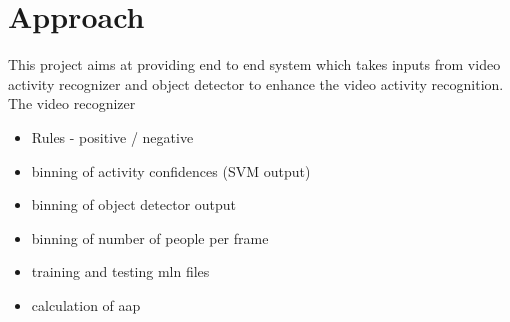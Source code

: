 \chapter{Approach}
\label{ch4_APPROACH}

This project aims at providing end to end system which takes inputs from
video activity recognizer and object detector to enhance the video activity recognition.
The video recognizer

\begin{itemize}
	\item Rules - positive / negative
	\item binning of activity confidences (SVM output)
	\item binning of object detector output
	\item binning of number of people per frame
	\item training and testing mln files
	\item calculation of aap
\end{itemize}
